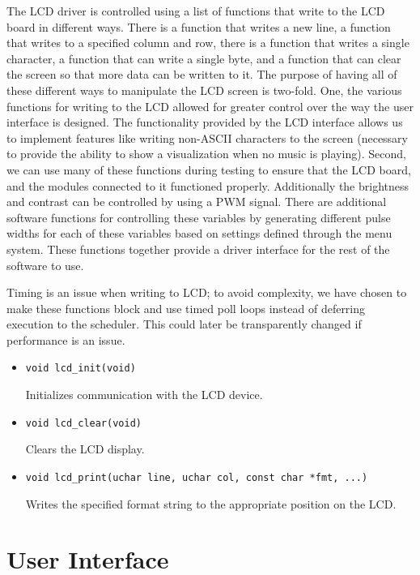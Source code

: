 The LCD driver is controlled using a list of functions that write to the LCD board in different ways. There is a function that writes a new line, a function that writes to a specified column and row, there is a function that writes a single character, a function that can write a single byte, and a function that can clear the screen so that more data can be written to it. The purpose of having all of these different ways to manipulate the LCD screen is two-fold. One, the various functions for writing to the LCD allowed for greater control over the way the user interface is designed. The functionality provided by the LCD interface allows us to implement features like writing non-ASCII characters to the screen (necessary to provide the ability to show a visualization when no music is playing). Second, we can use many of these functions during testing to ensure that the LCD board, and the modules connected to it functioned properly. Additionally the brightness and contrast can be controlled by using a PWM signal. There are additional software functions for controlling these variables by generating different pulse widths for each of these variables based on settings defined through the menu system. These functions together provide a driver interface for the rest of the software to use.

Timing is an issue when writing to LCD; to avoid complexity, we have chosen to make these functions block and use timed poll loops instead of deferring execution to the scheduler. This could later be transparently changed if performance is an issue.

\begin{itemize}
\item \verb|void lcd_init(void)|

Initializes communication with the LCD device.

\item \verb|void lcd_clear(void)|

Clears the LCD display.

\item \verb|void lcd_print(uchar line, uchar col, const char *fmt, ...)|

Writes the specified format string to the appropriate position on the LCD.
\end{itemize}

\section{User Interface}
\label{sec:ui}

